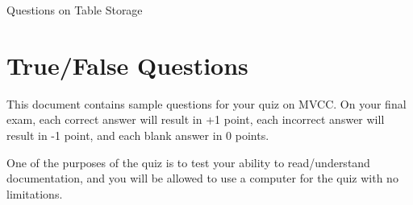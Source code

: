 \documentclass{exam}
\theoremstyle{definition}
\begin{document}
\begin{center}
\Huge
Questions on Table Storage
\end{center}


\section{True/False Questions}

This document contains sample questions for your quiz on MVCC.
On your final exam,
each correct answer will result in +1 point,
each incorrect answer will result in -1 point,
and each blank answer in 0 points.

One of the purposes of the quiz is to test your ability to read/understand documentation,
and you will be allowed to use a computer for the quiz with no limitations.

\end{document}
